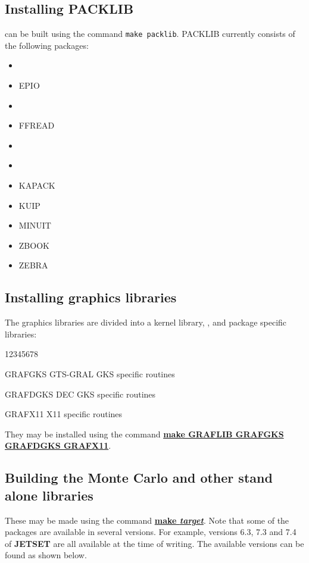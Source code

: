 \subsection{Installing PACKLIB}
\PACKLIB{} can be built using the command {\tt make packlib}.
PACKLIB currently consists of the following packages:
\begin{itemize}
\item
\CSPACK{}~\cite{bib-CSPACK}
\item
EPIO~\cite{bib-EPIO}
\item
\FATMEN{}~\cite{bib-FATMEN}
\item
FFREAD~\cite{bib-FFREAD}
\item
\HBOOK{}~\cite{bib-HBOOK}
\item
\HEPDB{}~\cite{bib-HEPDB}
\item
KAPACK~\cite{bib-KAPACK}
\item
KUIP~\cite{bib-KUIP}
\item
MINUIT~\cite{bib-MINUIT}
\item
ZBOOK~\cite{bib-ZBOOK}
\item
ZEBRA~\cite{bib-ZEBRA}
\end{itemize}
\subsection{Installing graphics libraries}
The graphics libraries are divided into a kernel library, \GRAFLIB{},
and package specific libraries:
\begin{DLtt}{12345678}
\item[GRAFGKS]GTS-GRAL GKS specific routines
\item[GRAFDGKS]DEC GKS specific routines
\item[GRAFX11]X11 specific routines
\end{DLtt}

They may be installed using the command {\underline {\bf make GRAFLIB GRAFGKS GRAFDGKS GRAFX11}}.

\subsection{Building the Monte Carlo and other stand alone libraries}
These may be made using the command {\underline {\bf make {\it target}}}. Note
that some of the packages are available in several versions.
For example, versions 6.3, 7.3 and 7.4 of {\bf JETSET} are all available
at the time of writing. The available versions can be found as shown
below.

